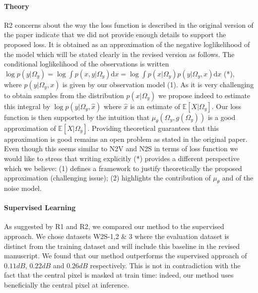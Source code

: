\documentclass{article}
\begin{document}
\paragraph{Theory}
R2 concerns about the way the loss function is described in the original version of the paper indicate that we did not provide enough details to support the proposed loss. It is obtained as an approximation of the negative loglikelihood of the model which will be stated clearly in the revised version as follows.
The conditional loglikelihood of the observations is written $ \log p(y|\Omega_y) = \log \int p(x,y|\Omega_y) \mathrm{d}x = \log \int p(x|\Omega_y)p(y|\Omega_y,x) \mathrm{d}x$ (*), where $p(y|\Omega_y,x)$ is given by our observation model (1).
As it is very challenging to obtain samples from the distribution $p(x|\Omega_y)$ we propose indeed to estimate this integral by $\log p(y|\Omega_y,\hat {x})$ where $\hat {x}$ is an estimate of $\mathbb{E}[X|\Omega_y]$. Our loss function is then supported by the intuition that $\mu_\theta(\Omega_y,g(\Omega_y))$ is a good approximation of $\mathbb{E}[X|\Omega_y]$. Providing theoretical guarantees that this approximation is good remains an open problem as stated in the original paper. Even though this seems similar to N2V and N2S in terms of loss function we would like to stress that writing explicitly (*) provides a different perspective which we believe:
(1) defines a framework to justify theoretically the proposed approximation (challenging issue); (2) highlights the contribution of $\mu_\theta$ and of the noise model.

\paragraph{Supervised Learning}
As suggested by R1 and R2, we compared our method to the supervised approach. We chose datasets W2S-1,2 \& 3 where the evaluation dataset is distinct from the training dataset and will include this baseline in the revised manuscript.
We found that our method outperforms the supervised approach of $0.11dB$, $0.22dB$ and $0.26dB$ respectively.
This is not in contradiction with the fact that the central pixel is masked at train time: indeed, our method uses beneficially the central pixel at inference.
\end{document}

